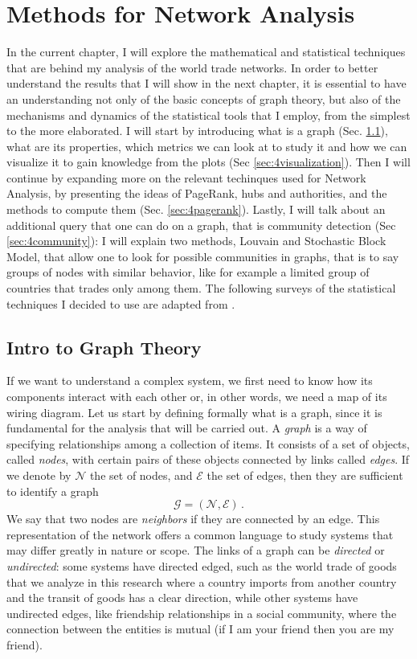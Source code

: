 \chapter{Methods for Network Analysis}

In the current chapter, I will explore the mathematical and statistical techniques that are behind my analysis of the world trade networks. In order to better understand the results that I will show in the next chapter, it is essential to have an understanding not only of the basic concepts of graph theory, but also of the mechanisms and dynamics of the statistical tools that I employ, from the simplest to the more elaborated. I will start by introducing what is a graph (Sec. \ref{sec:4graphtheory}), what are its properties, which metrics we can look at to study it and how we can visualize it to gain knowledge from the plots (Sec \ref{sec:4visualization}). Then I will continue by expanding more on the relevant techinques used for Network Analysis, by presenting the ideas of PageRank, hubs and authorities, and the methods to compute them (Sec. \ref{sec:4pagerank}). Lastly, I will talk about an additional query that one can do on a graph, that is community detection (Sec \ref{sec:4community}): I will explain two methods, Louvain and Stochastic Block Model, that allow one to look for possible communities in graphs, that is to say groups of nodes with similar behavior, like for example a limited group of countries that trades only among them. The following surveys of the statistical techniques I decided to use are adapted from \textcite{barabasi2016network,easley2012networks}.

\section{Intro to Graph Theory}\label{sec:4graphtheory}

If we want to understand a complex system, we first need to know how its components interact with each other or, in other words, we need a map of its wiring diagram.
Let us start by defining formally what is a graph, since it is fundamental for the analysis that will be carried out. 
A \textit{graph} is a way of specifying relationships among a collection of items. It consists of a set of objects, called \textit{nodes}, with certain pairs of these objects connected by links called \textit{edges}. If we denote by $\mathcal{N}$ the set of nodes, and $\mathcal{E}$ the set of edges, then they are sufficient to identify a graph 
\[ 
    \mathcal{G} = (\mathcal{N},\mathcal{E})\,. 
\]
We say that two nodes are \textit{neighbors} if they are connected by an edge. This representation of the network offers a common language to study systems that may differ greatly in nature or scope. The links of a graph can be \textit{directed} or \textit{undirected}: some systems have directed edged, such as the world trade of goods that we analyze in this research where a country imports from another country and the transit of goods has a clear direction, while other systems have undirected edges, like friendship relationships in a social community, where the connection between the entities is mutual (if I am your friend then you are my friend).

